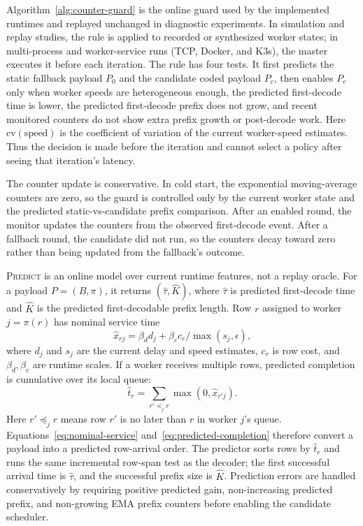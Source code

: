 Algorithm~\ref{alg:counter-guard} is the online guard used by the implemented
runtimes and replayed unchanged in diagnostic experiments.  In simulation and
replay studies, the rule is applied to recorded or synthesized worker states;
in multi-process and worker-service runs (TCP, Docker, and K3s), the master
executes it before each iteration.  The rule has four tests.  It first predicts
the static fallback
payload $P_0$ and the candidate coded payload $P_c$, then enables $P_c$ only
when worker speeds are heterogeneous enough, the predicted first-decode time is
lower, the predicted first-decode prefix does not grow, and recent monitored
counters do not show extra prefix growth or post-decode work.  Here
$\mathrm{cv}(\text{speed})$ is the coefficient of variation of the current
worker-speed estimates.  Thus the
decision is made before the iteration and cannot select a policy after seeing
that iteration's latency.

The counter update is conservative.  In cold start, the exponential
moving-average counters are zero, so the guard is controlled only by the current
worker state and the predicted static-vs-candidate prefix comparison.  After an
enabled round, the monitor updates the counters from the observed first-decode
event.  After a fallback round, the candidate did not run, so the counters decay
toward zero rather than being updated from the fallback's outcome.

\textsc{Predict} is an online model over current runtime features, not a replay
oracle.  For a payload $P=(B,\pi)$, it returns
$(\widehat{\tau},\widehat{K})$, where $\widehat{\tau}$ is predicted first-decode
time and $\widehat{K}$ is the predicted first-decodable prefix length.  Row $r$
assigned to worker $j=\pi(r)$ has nominal service time
\begin{equation}
  \label{eq:nominal-service}
  \widehat{x}_{rj}
  =
  \beta_d d_j + \beta_c c_r / \max(s_j,\epsilon),
\end{equation}
where $d_j$ and $s_j$ are the current delay and speed estimates, $c_r$ is row
cost, and $\beta_d,\beta_c$ are runtime scales.  If a worker receives multiple
rows, predicted completion is cumulative over its local queue:
\begin{equation}
  \label{eq:predicted-completion}
  \widehat{t}_r
  =
  \sum_{r' \preceq_j r} \max(0,\widehat{x}_{r'j}) .
\end{equation}
Here $r'\preceq_j r$ means row $r'$ is no later than $r$ in worker $j$'s queue.
Equations~\eqref{eq:nominal-service} and~\eqref{eq:predicted-completion}
therefore convert a payload into a predicted row-arrival order.
The predictor sorts rows by $\widehat{t}_r$ and runs the same incremental
row-span test as the decoder; the first successful arrival time is
$\widehat{\tau}$, and the successful prefix size is $\widehat{K}$.  Prediction
errors are handled conservatively by requiring positive predicted gain,
non-increasing predicted prefix, and non-growing EMA prefix counters before
enabling the candidate scheduler.

